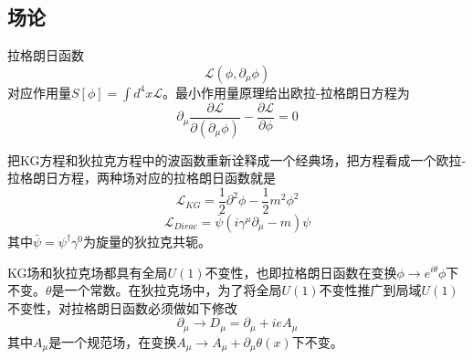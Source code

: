 \documentclass[a4paper,11pt]{ctexart}
\newcommand{\beq}{\begin{equation}}
\newcommand{\eeq}{\end{equation}}
\newcommand{\lag}{\mathcal{L}}
\begin{document}
\subsection{场论}
拉格朗日函数
\beq
\lag(\phi, \partial_\mu \phi)
\eeq
对应作用量$S[\phi] = \int d^4 x \lag$。最小作用量原理给出欧拉-拉格朗日方程为
\beq
\partial_\mu \frac{\partial \lag}{\partial \left( \partial_\mu \phi \right)} - \frac{\partial \lag}{\partial \phi} = 0
\eeq
\par
把KG方程和狄拉克方程中的波函数重新诠释成一个经典场，把方程看成一个欧拉-拉格朗日方程，两种场对应的拉格朗日函数就是
\beq
\lag_{KG} = \frac{1}{2} \partial^2 \phi - \frac{1}{2} m^2 \phi^2
\eeq
\beq
\lag_{Dirac} = \bar{\psi} \left(i \gamma^\mu \partial_\mu - m\right)\psi
\eeq
其中$\bar{\psi} = \psi^\dagger \gamma^0$为旋量的狄拉克共轭。
\par
KG场和狄拉克场都具有全局$U(1)$不变性，也即拉格朗日函数在变换$\phi \to e^{i \theta} \phi$下不变。$\theta$是一个常数。在狄拉克场中，为了将全局$U(1)$不变性推广到局域$U(1)$不变性，对拉格朗日函数必须做如下修改
\beq
\partial_\mu \to D_\mu = \partial_\mu + ieA_\mu
\eeq
其中$A_\mu$是一个规范场，在变换$A_\mu \to A_\mu + \partial_\mu \theta(x)$下不变。
\end{document}
